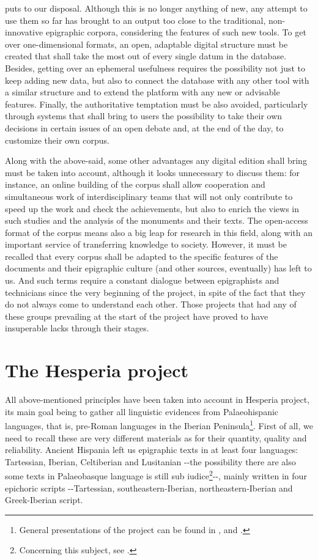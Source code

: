 \documentclass[amsthm,ebook]{saparticle}
\begin{document}
puts to our disposal. Although this is no longer anything of new, any attempt to use them so far has brought to an
output too close to the traditional, non-innovative epigraphic corpora, considering the features of such new tools. To
get over one-dimensional formats, an open, adaptable digital structure must be created that shall take the most out of
every single datum in the database. Besides, getting over an ephemeral usefulness requires the possibility not just to
keep adding new data, but also to connect the database with any other tool with a similar structure and to extend the
platform with any new or advisable features. Finally, the authoritative temptation must be also avoided, particularly
through systems that shall bring to users the possibility to take their own decisions in certain issues of an open
debate and, at the end of the day, to customize their own corpus.

Along with the above-said, some other advantages any digital edition shall bring must be taken into account, although it
looks unnecessary to discuss them: for instance, an online building of the corpus shall allow cooperation and
simultaneous work of interdisciplinary teams that will not only contribute to speed up the work and check the
achievements, but also to enrich the views in such studies and the analysis of the monuments and their texts. The
open-access format of the corpus means also a big leap for research in this field, along with an important service of
transferring knowledge to society. However, it must be recalled that every corpus shall be adapted to the specific
features of the documents and their epigraphic culture (and other sources, eventually) has left to us. And such terms
require a constant dialogue between epigraphists and technicians since the very beginning of the project, in spite of
the fact that they do not always come to understand each other. Those projects that had any of these groups prevailing
at the start of the project have proved to have insuperable lacks through their stages. 

\section{The Hesperia project}


All above-mentioned principles have been taken into account in Hesperia project, its main goal being to gather all
linguistic evidences from Palaeohispanic languages, that is, pre-Roman languages in the Iberian Peninsula\footnote{
General presentations of the project can be found in \citet{orduna_implementing_????}, \citet{orduna_philology_????} and
\citet{velaza_hesperia:_2014}.}. First of all, we need to recall these are very different materials as for their quantity, quality and
reliability. Ancient Hispania left us epigraphic texts in at least four languages: Tartessian, Iberian, Celtiberian and
Lusitanian -{}-the possibility there are also some texts in Palaeobasque language is still sub iudice\footnote{
Concerning this subject, see \citet{velaza_epigrafiy_2009}.}{}-{}-, mainly written in four epichoric scripts -{}-Tartessian,
southeastern-Iberian, northeastern-Iberian and Greek-Iberian script. 
\end{document}
